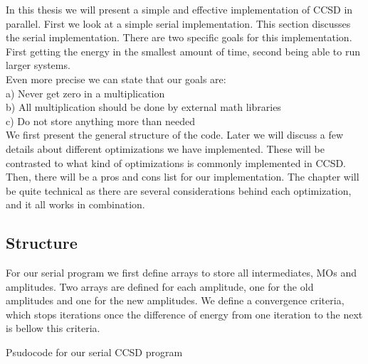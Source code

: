 In this thesis we will present a simple and effective implementation of CCSD in parallel. First we look at a simple serial implementation. This section discusses the serial implementation. There are two specific goals for this implementation. First getting the energy in the smallest amount of time, second being able to run larger systems. \\

Even more precise we can state that our goals are: \\
a) Never get zero in a multiplication\\
b) All multiplication should be done by external math libraries\\
c) Do not store anything more than needed\\

We first present the general structure of the code. Later we will discuss a few details about different optimizations we have implemented. These will be contrasted to what kind of optimizations is commonly implemented in CCSD. Then, there will be a pros and cons list for our implementation. The chapter will be quite technical as there are several considerations behind each optimization, and it all works in combination. 

\newpage

\subsection{Structure}

For our serial program we first define arrays to store all intermediates, MOs and amplitudes. Two arrays are defined for each amplitude, one for the old amplitudes and one for the new amplitudes. We define a convergence criteria, which stops iterations once the difference of energy from one iteration to the next is bellow this criteria. \\

\begin{algorithm}[H]
 \caption{Psudocode for our serial CCSD program}
 \label{CCSD_STRUCTURE_SERIAL}
\end{algorithm}

